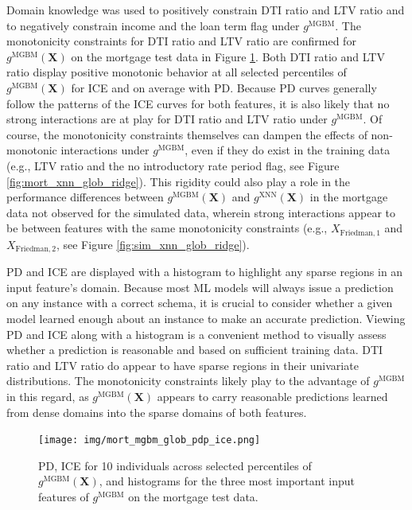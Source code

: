 \documentclass[information,article,submit,moreauthors,pdftex]{definitions/mdpi}
\begin{document}
Domain knowledge was used to positively constrain DTI ratio and LTV ratio and to negatively constrain income and the loan term flag under $g^\text{MGBM}$. The monotonicity constraints for DTI ratio and LTV ratio are confirmed for $g^\text{MGBM}(\mathbf{X})$ on the mortgage test data in Figure \ref{fig:mort_mgbm_glob_pdp_ice}. Both DTI ratio and LTV ratio display positive monotonic behavior at all selected percentiles of $g^\text{MGBM}(\mathbf{X})$ for ICE and on average with PD. Because PD curves generally follow the patterns of the ICE curves for both features, it is also likely that no strong interactions are at play for DTI ratio and LTV ratio under $g^\text{MGBM}$. Of course, the monotonicity constraints themselves can dampen the effects of non-monotonic interactions under $g^\text{MGBM}$, even if they do exist in the training data (e.g., LTV ratio and the no introductory rate period flag, see Figure \ref{fig:mort_xnn_glob_ridge}). This rigidity could also play a role in the performance differences between $g^\text{MGBM}(\mathbf{X})$ and $g^\text{XNN}(\mathbf{X})$ in the mortgage data not observed for the simulated data, wherein strong interactions appear to be between features with the same monotonicity constraints (e.g., $X_{\text{Friedman},1}$ and $X_{\text{Friedman},2}$, see Figure \ref{fig:sim_xnn_glob_ridge}).

PD and ICE are displayed with a histogram to highlight any sparse regions in an input feature's domain. Because most ML models will always issue a prediction on any instance with a correct schema, it is crucial to consider whether a given model learned enough about an instance to make an accurate prediction. Viewing PD and ICE along with a histogram is a convenient method to visually assess whether a prediction is reasonable and based on sufficient training data. DTI ratio and LTV ratio do appear to have sparse regions in their univariate distributions. The monotonicity constraints likely play to the advantage of $g^\text{MGBM}$ in this regard, as $g^\text{MGBM}(\mathbf{X})$ appears to carry reasonable predictions learned from dense domains into the sparse domains of both features. 

\begin{figure}[htb]
\hskip-10pt\texttt{[image: img/mort\_mgbm\_glob\_pdp\_ice.png]}
\caption{PD, ICE for 10 individuals across selected percentiles of $g^\text{MGBM}(\mathbf{X})$, and histograms for the three most important input features of $g^\text{MGBM}$ on the mortgage test data.}
\label{fig:mort_mgbm_glob_pdp_ice}
\end{figure}   
\end{document}
